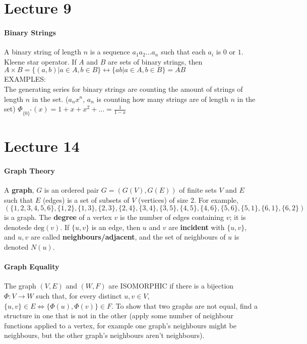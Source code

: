 \documentclass[10pt,letter]{article}
\begin{document}
\section*{Lecture 9}
\paragraph{Binary Strings}
A binary string of length $n$ is a sequence $a_1a_2\ldots a_n$ such that each $a_i$ is $0$ or $1$. 
Kleene star operator. 
If $A$ and $B$  are sets of binary strings, then $A\times B=\{(a,b)|a\in A,b\in B\}\leftrightarrow\{ab|a\in A, b\in B\}=AB$\\ 
EXAMPLES: \\ 
The generating series for binary strings are counting the amount of strings of length $n$ in the set. ($a_nx^n$, $a_n$ is counting how many strings are of length $n$ in the set)
$\Phi_{\{0\}^*}(x)=1+x+x^2+\ldots=\frac{1}{1-x}$ 

\section*{Lecture 14}
\paragraph{Graph Theory}
A \textbf{graph}, $G$ is an ordered pair $G=(G(V),G(E))$ of finite sets $V$ and $E$ such that $E$ (edges) is a set of subsets of $V$ (vertices) of size 2. For example, $(\{1,2,3,4,5,6\},\{1,2\},\{1,3\},\{2,3\},\{2,4\},\{3,4\},\{3,5\},\{4,5\},\{4,6\},\{5,6\},\{5,1\},\{6,1\},\{6,2\})$ is a graph. The \textbf{degree} of a vertex $v$ is the number of edges containing $v$; it is denotede $\text{deg}(v)$. If $\{u,v\}$ is an edge, then $u$ and $v$ are \textbf{incident} with $\{u,v\}$, and $u,v$ are called \textbf{neighbours/adjacent}, and the set of neighbours of $u$ is denoted $N(u)$. 

\paragraph{Graph Equality}
The graph $(V,E)$ and $(W,F)$ are ISOMORPHIC if there is a bijection $\Phi:V\rightarrow W$ such that, for every distinct $u,v\in V$, $\{u,v\}\in E\Leftrightarrow \{\Phi(u),\Phi(v)\}\in F$. To show that two graphs are not equal, find a structure in one that is not in the other (apply some number of neighbour functions applied to a vertex, for example one graph's neighbours might be neighbours, but the other graph's neighbours aren't neighbours). 
\end{document}
